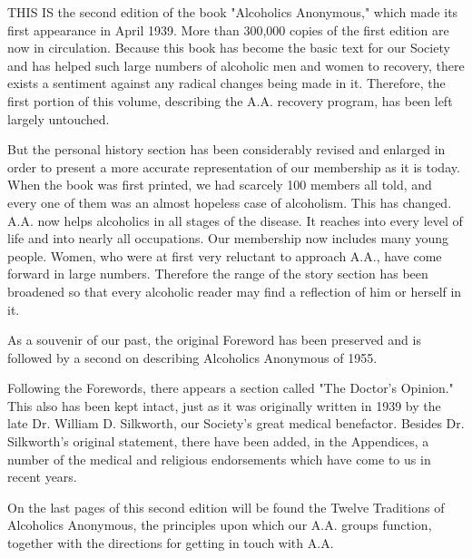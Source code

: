 
\bbChapterPreamble


\begin{biblechapter}
    THIS IS the second edition of the book "Alcoholics Anonymous," 
    which made its first appearance in April 1939.
\verse More than 300,000 copies of the first edition are now in circulation.
\verse Because this book has become 
    the basic text for our Society 
    and has helped such large numbers 
    of alcoholic men and women to recovery, 
    there exists a sentiment against any radical changes being made in it.
\verse Therefore, the first portion of this volume, 
    describing the A.A. recovery program, 
    has been left largely untouched.

    But the personal history section has been considerably revised 
    and enlarged
    in order to present a more accurate representation of 
    our membership as it is today.
\verse When the book was first printed, 
    we had scarcely 100 members all told, 
    and every one of them was an almost hopeless case of alcoholism. 
\verse This has changed.
\verse A.A. now helps alcoholics in all stages of the disease.
\verse It reaches into every level of life 
    and into nearly all occupations.
\verse Our membership now includes many young people.
\verse Women, who were at first very reluctant to approach A.A., 
    have come forward in large numbers.
\verse Therefore the range of the story section has been broadened 
    so that every alcoholic reader may find a reflection 
    of him or herself in it.

    As a souvenir of our past, 
    the original Foreword has been preserved 
    and is followed by a second 
    on describing Alcoholics Anonymous of 1955.

    Following the Forewords, 
    there appears a section called "The Doctor's Opinion."  
    This also has been kept intact, 
    just as it was originally written in 1939 
    by the late Dr. William D. Silkworth, 
    our Society's great medical benefactor. 
\verse Besides Dr. Silkworth's original statement, 
    there have been added, 
    in the Appendices,
    a number of the medical and religious endorsements
    which have come to us in recent years.

    On the last pages of this second edition 
    will be found the Twelve Traditions of Alcoholics Anonymous, 
    the principles upon which our A.A. groups function, 
    together with the directions for getting in touch with A.A.
\end{biblechapter}
